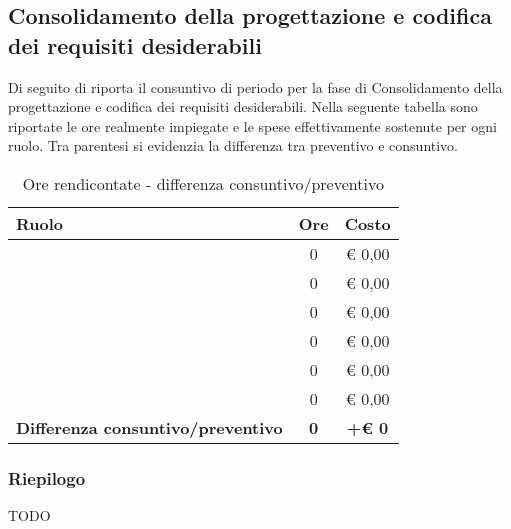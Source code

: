 
			\subsection{Consolidamento della progettazione e codifica dei requisiti desiderabili} %
				Di seguito di riporta il consuntivo di periodo per la fase di Consolidamento della progettazione e codifica dei requisiti desiderabili. \newline
				Nella seguente tabella sono riportate le ore realmente impiegate e le spese effettivamente sostenute per ogni ruolo. Tra parentesi si evidenzia la differenza tra preventivo e consuntivo.
				\begin{table}[!h]
					\begin{center}
						\begin{tabularx}{0.90\textwidth}{|X|c|c|}
							\hline
							\textbf{Ruolo} & \textbf{Ore} & \textbf{Costo} \\
							\hline
							\roleProjectManager & 0 & \euro{} 0,00 \\
							\hline
							\roleAnalyst & 0 &  \euro{} 0,00 \\
							\hline
							\roleDesigner & 0 & \euro{} 0,00 \\
							\hline
							\roleAdministrator & 0  & \euro{} 0,00 \\
							\hline
							\roleProgrammer & 0 & \euro{} 0,00 \\
							\hline
							\roleVerifier & 0 & \euro{} 0,00 \\
							\hline
							\textbf{Differenza consuntivo/preventivo} & \textbf{0} & \textbf{+\euro{} 0} \\
							\hline
						\end{tabularx}
					\end{center}
				\caption{Ore rendicontate - differenza consuntivo/preventivo}
				\end{table}

				\subsubsection{Riepilogo} %
				TODO


